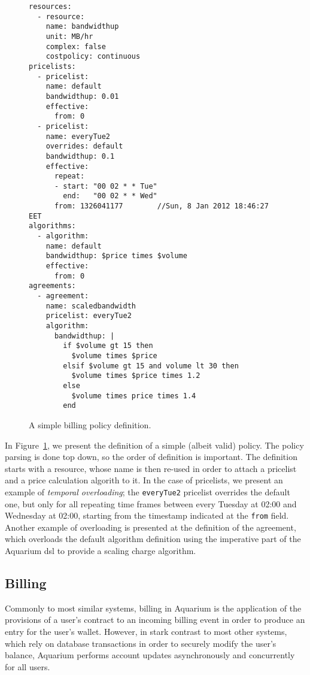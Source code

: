 \documentclass[preprint,10pt]{sigplanconf}
\begin{document}
\begin{figure}
\lstset{language=c, basicstyle=\footnotesize,
stringstyle=\ttfamily, 
flexiblecolumns=true, aboveskip=-0.9em, belowskip=0em, lineskip=0em}

\begin{lstlisting}
resources:
  - resource:
    name: bandwidthup
    unit: MB/hr
    complex: false
    costpolicy: continuous
pricelists:
  - pricelist: 
    name: default
    bandwidthup: 0.01
    effective:
      from: 0
  - pricelist: 
    name: everyTue2
    overrides: default
    bandwidthup: 0.1
    effective:
      repeat:
      - start: "00 02 * * Tue"
        end:   "00 02 * * Wed"
      from: 1326041177        //Sun, 8 Jan 2012 18:46:27 EET
algorithms:
  - algorithm:
    name: default
    bandwidthup: $price times $volume
    effective:
      from: 0
agreements:
  - agreement:
    name: scaledbandwidth
    pricelist: everyTue2
    algorithm:
      bandwidthup: |
        if $volume gt 15 then
          $volume times $price
        elsif $volume gt 15 and volume lt 30 then
          $volume times $price times 1.2
        else
          $volume times price times 1.4
        end
\end{lstlisting}

\caption{A simple billing policy definition.} 
\label{fig:dsl}
\end{figure}

In Figure~\ref{fig:dsl}, we present the definition of a simple (albeit valid) 
policy. The policy parsing is done top down, so the order of definition 
is important. The definition starts with a resource, whose name is then
re-used in order to attach a pricelist and a price calculation algorith to it.
In the case of pricelists, we present an example of \emph{temporal overloading};
the \texttt{everyTue2} pricelist overrides the default one, but only for 
all repeating time frames between every Tuesday at 02:00 and Wednesday at
02:00, starting from the timestamp indicated at the \texttt{from} field. Another
example of overloading is presented at the definition of the agreement, which
overloads the default algorithm definition using the imperative part of the
Aquarium {\sc dsl} to provide a scaling charge algorithm.

\subsection{Billing}

Commonly to most similar systems, billing in Aquarium is the application of the
provisions of a user's contract to an incoming billing event in order to
produce an entry for the user's wallet. However, in stark contrast to most
other systems, which rely on database transactions in order to securely modify
the user's balance, Aquarium performs account updates asynchronously and
concurrently for all users.
\end{document}
